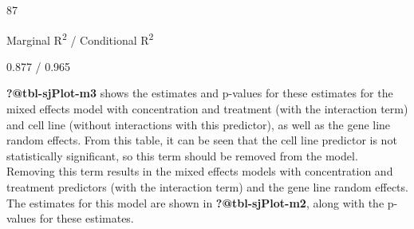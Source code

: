\documentclass[
  letterpaper,
  DIV=11,
  numbers=noendperiod]{scrartcl}
\begin{document}
\begin{table}
\begin{minipage}[t]{\linewidth}
{}

\end{minipage}%
\newline
\begin{minipage}[t]{\linewidth}

{\centering 

87

}

\end{minipage}%
\newline
\begin{minipage}[t]{\linewidth}

{\centering 

Marginal R\textsuperscript{2} / Conditional R\textsuperscript{2}

}

\end{minipage}%
\newline
\begin{minipage}[t]{\linewidth}

{\centering 

0.877 / 0.965

}

\end{minipage}%

\end{table}

\textbf{?@tbl-sjPlot-m3} shows the estimates and p-values for these
estimates for the mixed effects model with concentration and treatment
(with the interaction term) and cell line (without interactions with
this predictor), as well as the gene line random effects. From this
table, it can be seen that the cell line predictor is not statistically
significant, so this term should be removed from the model. Removing
this term results in the mixed effects models with concentration and
treatment predictors (with the interaction term) and the gene line
random effects. The estimates for this model are shown in
\textbf{?@tbl-sjPlot-m2}, along with the p-values for these estimates.
\end{document}
